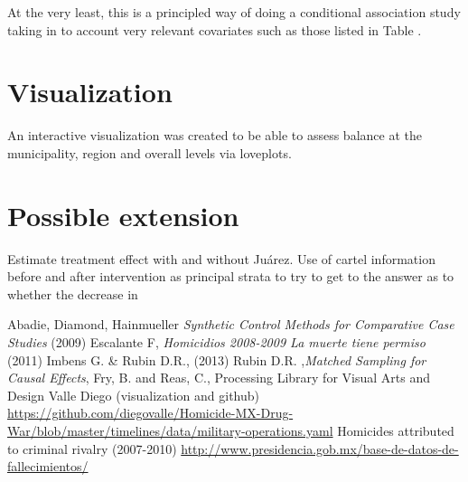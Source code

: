 \documentclass{article}[11 pt]
\begin{document}
At the very least, this is a principled way of doing a conditional association study taking in to account very relevant covariates such as those listed in Table \label{Tab1}.

\section{Visualization}
An interactive visualization was created to be able to assess balance at the municipality, region and overall levels via loveplots. 

\section{Possible extension}
Estimate treatment effect with and without Ju\'{a}rez.
Use of cartel information before and after intervention as principal strata to try to get to the answer as to whether the decrease in 


        \begin{thebibliography}{99}
           Abadie, Diamond, Hainmueller  \emph{Synthetic Control Methods for Comparative Case Studies} (2009)
           Escalante F, \emph{Homicidios 2008-2009 La muerte tiene permiso} (2011)
           Imbens G. \& Rubin D.R., (2013)
           Rubin D.R. ,\emph{Matched Sampling for Causal Effects},
 Fry, B. and Reas, C., Processing Library for Visual Arts and Design
            Valle Diego (visualization and github) \url{https://github.com/diegovalle/Homicide-MX-Drug-War/blob/master/timelines/data/military-operations.yaml}
		Homicides attributed to criminal rivalry (2007-2010)
	\url{http://www.presidencia.gob.mx/base-de-datos-de-fallecimientos/}          
\end{thebibliography}

\end{document}
